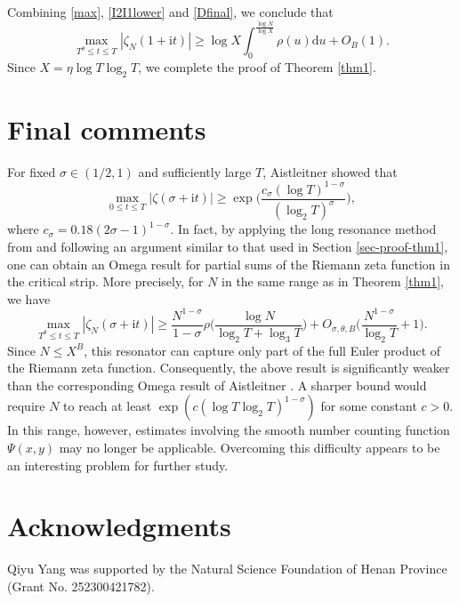 \documentclass[12pt,reqno]{amsart}
\theoremstyle{definition}
\numberwithin{equation}{section}
\newcommand{\Bg}{\Big}
\newcommand{\lo}{\log_2}
\newcommand{\lt}{\log_3}
\newcommand{\mmd}{\mathrm{d}}
\newcommand{\mit}{\mathrm{i}t}
\begin{document}
Combining \eqref{max}, \eqref{I2I1lower} and \eqref{Dfinal}, we conclude that
\[
\max_{T^\theta\le t\le T}|\zeta_N(1+\mit)| \ge \log X \int_0^{\frac{\log N}{\log X}}\rho(u) \mmd u +O_B(1).
\]
Since \(X=\eta\log T \lo T\), we complete the proof of Theorem \ref{thm1}.

\section{Final comments}
\label{sec-final}

For fixed \(\sigma \in (1/2,1)\) and sufficiently large \(T\), Aistleitner \cite{aistleitner2016MathAnn} showed that 
\[
\max_{0 \le t \le T} |\zeta(\sigma+\mit)| \ge \exp\Bg(\frac{c_\sigma(\log T)^{1-\sigma}}{(\lo T)^\sigma} \Bg),
\]
where \(c_\sigma=0.18(2\sigma-1)^{1-\sigma}\). In fact, by applying the long resonance method from \cite{yang2023omega} and following an argument similar to that used in Section \ref{sec-proof-thm1}, one can obtain an Omega result for partial sums of the Riemann zeta function in the critical strip. More precisely, for \(N\) in the same range as in Theorem \ref{thm1}, we have
    \[
    \max_{T^\theta \le t \le T}|\zeta_N(\sigma+\mit)| \ge \frac{N^{1-\sigma}}{1-\sigma}\rho \Bg(\frac{\log N}{\lo T+\lt T} \Bg) + O_{\sigma,\theta,B}\Bg(\frac{N^{1-\sigma}}{\lo T} +1\Bg).
    \]
Since \(N \le X^B\), this resonator can capture only part of the full Euler product of the Riemann zeta function. Consequently, the above result is significantly weaker than the corresponding Omega result of Aistleitner \cite{aistleitner2016MathAnn}. A sharper bound would require \(N\) to reach at least \(\exp (c(\log T \lo T)^{1-\sigma})\) for some constant \(c>0\). In this range, however, estimates involving the smooth number counting function \(\Psi(x,y)\) may no longer be applicable. Overcoming this difficulty appears to be an interesting problem for further study. 



\section*{Acknowledgments}
Qiyu Yang was supported by the Natural Science Foundation of Henan Province (Grant No. 252300421782). 
	
	
    
\end{document}
